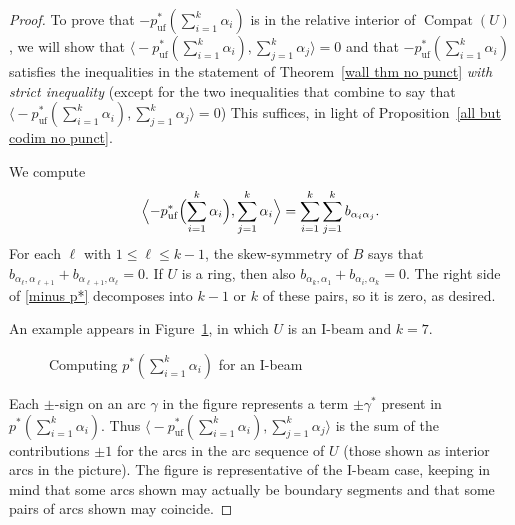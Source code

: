 \documentclass{amsart}
\theoremstyle{definition}
\theoremstyle{remark}
\numberwithin{equation}{section}
\newcommand{\uf}{{\operatorname{uf}}}
\newcommand{\brr}[1]{{\bigl\langle #1 \bigr\rangle}}
\newcommand{\brrr}[1]{{\Bigl\langle #1 \Bigr\rangle}}
\newcommand{\0}{{\mathbf{0}}}
\newcommand{\Compat}{\operatorname{Compat}}
\begin{document}
\begin{proof}
To prove that $-p^*_\uf(\sum_{i=1}^k\alpha_i)$ is in the relative interior of $\Compat(U)$, we will show that $\brr{-p^*_\uf(\sum_{i=1}^k\alpha_i),\sum_{j=1}^k\alpha_j}=0$ and that $-p^*_\uf(\sum_{i=1}^k\alpha_i)$ satisfies the inequalities in the statement of Theorem~\ref{wall thm no punct} \emph{with strict inequality} (except for the two inequalities that combine to say that $\brr{-p^*_\uf(\sum_{i=1}^k\alpha_i),\sum_{j=1}^k\alpha_j}=0$)
This suffices, in light of Proposition~\ref{all but codim no punct}.

We compute
\begin{equation}\label{minus p*}
\brrr{-p^*_\uf\Bigl(\sum_{i=1}^k\alpha_i\Bigr),\sum_{j=1}^k\alpha_i}=\sum_{i=1}^k\sum_{j=1}^kb_{\alpha_i\alpha_j}.
\end{equation}
For each $\ell$ with $1\le\ell\le k-1$, the skew-symmetry of $B$ says that $b_{\alpha_\ell,\alpha_{\ell+1}}+b_{\alpha_{\ell+1},\alpha_\ell}=0$.
If $U$ is a ring, then also $b_{\alpha_k,\alpha_1}+b_{\alpha_i,\alpha_k}=0$.
The right side of \eqref{minus p*} decomposes into $k-1$ or $k$ of these pairs, so it is zero, as desired.

An example appears in Figure~\ref{pstar}, in which $U$ is an I-beam and $k=7$.
\begin{figure}
\caption{Computing $p^*(\sum_{i=1}^k\alpha_i)$ for an I-beam}
\label{pstar}
\end{figure}
Each $\pm$-sign on an arc $\gamma$ in the figure represents a term $\pm\gamma^*$ present in $p^*(\sum_{i=1}^k\alpha_i)$.
Thus $\brr{-p^*_\uf(\sum_{i=1}^k\alpha_i),\sum_{j=1}^k\alpha_j}$ is the sum of the contributions $\pm1$ for the arcs in the arc sequence of $U$ (those shown as interior arcs in the picture).
The figure is representative of the I-beam case, keeping in mind that some arcs shown may actually be boundary segments and that some pairs of arcs shown may coincide.  


\end{proof}
\end{document}
